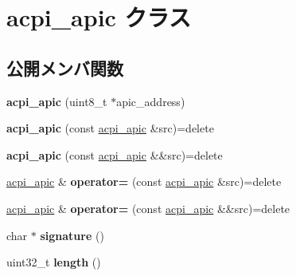 \hypertarget{classacpi__apic}{}\section{acpi\+\_\+apic クラス}
\label{classacpi__apic}
\subsection*{公開メンバ関数}
\begin{DoxyCompactItemize}
\item 
\hypertarget{classacpi__apic_aaa636a85e07fb4355d12635280edf517}{}{\bfseries acpi\+\_\+apic} (uint8\+\_\+t $\ast$apic\+\_\+address)\label{classacpi__apic_aaa636a85e07fb4355d12635280edf517}

\item 
\hypertarget{classacpi__apic_a8f68e76b4b3f8e39c475e26954a81a2e}{}{\bfseries acpi\+\_\+apic} (const \hyperlink{classacpi__apic}{acpi\+\_\+apic} \&src)=delete\label{classacpi__apic_a8f68e76b4b3f8e39c475e26954a81a2e}

\item 
\hypertarget{classacpi__apic_a7c75e8b9a5b87493fbde26a86ffa5df0}{}{\bfseries acpi\+\_\+apic} (const \hyperlink{classacpi__apic}{acpi\+\_\+apic} \&\&src)=delete\label{classacpi__apic_a7c75e8b9a5b87493fbde26a86ffa5df0}

\item 
\hypertarget{classacpi__apic_a476b0daaeec3225c9a4f68114d276bd3}{}\hyperlink{classacpi__apic}{acpi\+\_\+apic} \& {\bfseries operator=} (const \hyperlink{classacpi__apic}{acpi\+\_\+apic} \&src)=delete\label{classacpi__apic_a476b0daaeec3225c9a4f68114d276bd3}

\item 
\hypertarget{classacpi__apic_acd939e20b14be73b59876556548c3ff5}{}\hyperlink{classacpi__apic}{acpi\+\_\+apic} \& {\bfseries operator=} (const \hyperlink{classacpi__apic}{acpi\+\_\+apic} \&\&src)=delete\label{classacpi__apic_acd939e20b14be73b59876556548c3ff5}

\item 
\hypertarget{classacpi__apic_a7b763605f2e261a30200bdabd26a022c}{}char $\ast$ {\bfseries signature} ()\label{classacpi__apic_a7b763605f2e261a30200bdabd26a022c}

\item 
\hypertarget{classacpi__apic_a2a84d72623015c66cc7aae8b154f6dd8}{}uint32\+\_\+t {\bfseries length} ()\label{classacpi__apic_a2a84d72623015c66cc7aae8b154f6dd8}


\end{DoxyCompactItemize}
